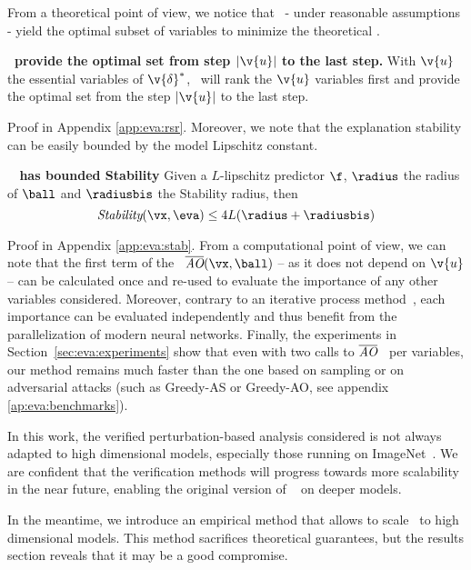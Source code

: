 From a theoretical point of view, we notice that \eva~- under reasonable assumptions - yield the optimal subset of variables to minimize the theoretical \rsr.

\begin{theorem}\textbf{\eva~provide the optimal set from step $|\v{u}|$ to the last step.}
\label{thm:eva:rsr}
With $\v{u}$ the essential variables of $\v{\delta}^*$, \eva~will rank the $\v{u}$ variables first and provide the optimal set from the step $|\v{u}|$ to the last step. 
\end{theorem}

Proof in Appendix \autoref{app:eva:rsr}. Moreover, we note that the explanation stability can be easily bounded by the model Lipschitz constant.

\begin{theorem}\textbf{\eva~ has bounded Stability}
\label{thm:eva:stab}
Given a $L$-lipschitz predictor $\f$, $\radius$ the radius of $\ball$ and $\radiusbis$ the Stability radius, then
$$
\textit{Stability}(\vx, \eva) \leq 4L(\radius + \radiusbis)
$$
\end{theorem}
Proof in Appendix \autoref{app:eva:stab}.
From a computational point of view, we can note that the first term of the \adv~$\AOup(\vx, \ball)$ -- as it does not depend on $\v{u}$ -- can be calculated once and re-used to evaluate the importance of any other variables considered. 
Moreover, contrary to an iterative process method~\cite{Fong_2017, hsieh2020evaluations, ignatiev2019abduction}, each importance can be evaluated independently and thus benefit from the parallelization of modern neural networks. Finally, the experiments in Section~\ref{sec:eva:experiments} show that even with two calls to $\overline{\textit{AO}}$~ per variables, our method remains much faster than the one based on sampling or on adversarial attacks (such as Greedy-AS or Greedy-AO, see appendix \ref{ap:eva:benchmarks}). %

In this work, the verified perturbation-based analysis considered is not always adapted to high dimensional models, especially those running on ImageNet~\cite{imagenet_cvpr09}. We are confident that the verification methods will progress towards more scalability in the near future, enabling the original version of \eva~ on deeper models. 

In the meantime, we introduce an empirical method that allows to scale \eva~to high dimensional models. This method sacrifices theoretical guarantees, but the results section reveals that it may be a good compromise.

